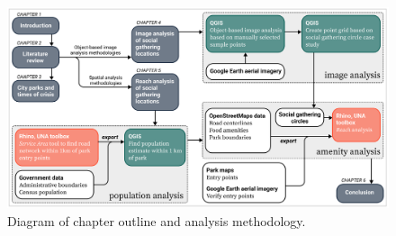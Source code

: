 \begin{figure}[H]
  \centering
  \includegraphics[width=1.0\textwidth]{images/introduction/process.png}
  \captionsetup{width=1.0\linewidth}
  \caption[Chapter diagram]{Diagram of chapter outline and analysis methodology.}
  \label{fig:process}
\end{figure}

